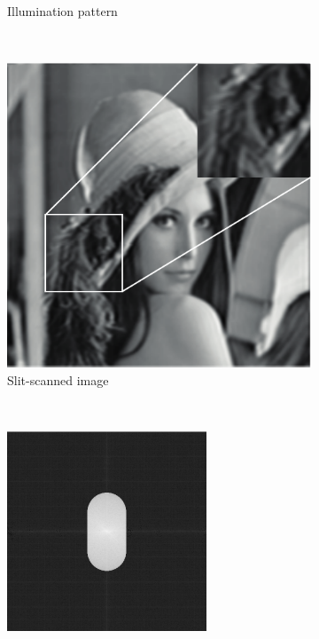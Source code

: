 \begin{figure}[h]
\begin{subfigure}[t]{0.23\textwidth}
      \caption{Illumination pattern}
  \end{subfigure}\\
  \begin{subfigure}[t]{0.23\textwidth}
      \centering
      \includegraphics[width=\textwidth]{widefield_slit/slitscanned}
      \caption{Slit-scanned image}
  \end{subfigure}~
  \begin{subfigure}[t]{0.23\textwidth}
      \centering
      \includegraphics[width=\textwidth]{widefield_slit/slitscanning_fft}

\end{subfigure}
\end{figure}
